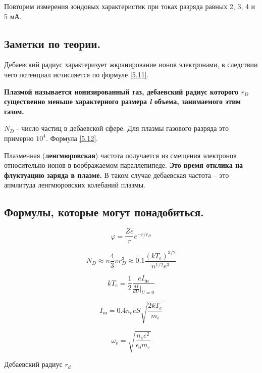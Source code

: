 \documentclass[a4paper,12pt]{article} %
\begin{document}
Повторим измерения зондовых характеристик при токах разряда равных 2, 3, 4 и 5 мА.

\subsection{Заметки по теории.}

Дебаевский радиус характеризует жкранирование ионов электронами, в следствии чего потенциал исчисляется по формуле \eqref{5.11}.

\textbf{Плазмой называется ионизированный газ, дебаевский радиус которого $r_D$ существенно меньше характерного размера \textit{l} объема, занимаемого этим газом.}

$N_D$ - число частиц в дебаевской сфере. Для плазмы газового разряда это примерно $10^4$. Формула \eqref{5.12}.

Плазменная (\textbf{ленгмюровская}) частота получается из смещения электронов относительно ионов в воображаемом параллепипеде. \textbf{Это время отклика на флуктуацию заряда в плазме.} В таком случае дебаевская частота -- это апмлитуда ленгмюровских колебаний плазмы.

\subsection{Формулы, которые могут понадобиться.}

\begin{equation}\label{5.11}
\varphi = \frac {Ze} {r} e^{-r / r_D}
\end{equation}

\begin{equation}\label{5.12}
N_D \approx n \frac{4}{3} \pi r^3_D \approx 0.1 \frac{(kT_e)^{3/2}}
{n^{1/2} e^3}
\end{equation}

\begin{equation}\label{5.43}
kT_e = \frac{1}{2} \frac{e I_{i\text{н}}} {\frac{dI}{dU}\vert_{U = 0}}
\end{equation}

\begin{equation}\label{5.31}
I_{i\text{н}} = 0.4n_e eS \sqrt{\frac{2kT_e}{m_i}}
\end{equation}

\begin{equation}\label{5.16}
\omega_p = \sqrt{ \frac{n_e e^2}{\epsilon_0 m_e} }
\end{equation}


Дебаевский радиус $r_d$
\end{document}

